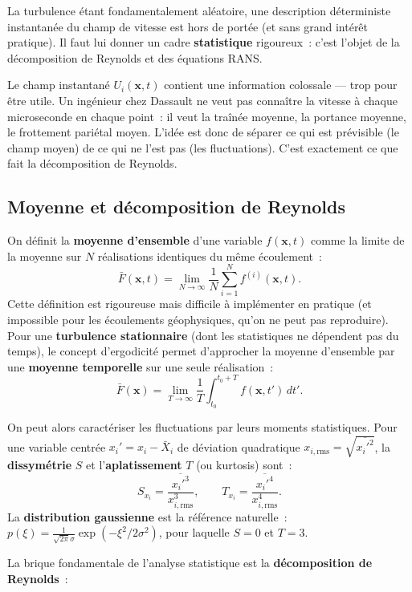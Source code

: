 \documentclass[11pt,a4paper]{report}
\begin{document}
La turbulence \'etant fondamentalement al\'eatoire, une description d\'eterministe
instantan\'ee du champ de vitesse est hors de port\'ee (et sans grand int\'er\^et
pratique). Il faut lui donner un cadre \textbf{statistique} rigoureux~: c'est l'objet
de la d\'ecomposition de Reynolds et des \'equations RANS.

Le champ instantan\'e $U_i(\bm{x},t)$ contient une information colossale --- trop pour
\^etre utile. Un ing\'enieur chez Dassault ne veut pas conna\^itre la vitesse \`a chaque
microseconde en chaque point~: il veut la tra\^in\'ee moyenne, la portance moyenne, le
frottement pari\'etal moyen. L'id\'ee est donc de s\'eparer ce qui est pr\'evisible (le champ
moyen) de ce qui ne l'est pas (les fluctuations). C'est exactement ce que fait la
d\'ecomposition de Reynolds.

\subsection{Moyenne et d\'ecomposition de Reynolds}

On d\'efinit la \textbf{moyenne d'ensemble} d'une variable $f(\bm{x},t)$
comme la limite de la moyenne sur $N$ r\'ealisations identiques du m\^eme \'ecoulement~:
\[
  \bar{F}(\bm{x},t) = \lim_{N\to\infty} \frac{1}{N}\sum_{i=1}^{N} f^{(i)}(\bm{x},t).
\]
Cette d\'efinition est rigoureuse mais difficile \`a impl\'ementer en pratique (et impossible pour
les \'ecoulements g\'eophysiques, qu'on ne peut pas reproduire). Pour une
\textbf{turbulence stationnaire} (dont les statistiques ne d\'ependent pas du temps), le
concept d'ergodicit\'e permet d'approcher la moyenne d'ensemble par une
\textbf{moyenne temporelle} sur une seule r\'ealisation~:
\[
  \bar{F}(\bm{x}) = \lim_{T\to\infty} \frac{1}{T}\int_{t_0}^{t_0+T}
  f(\bm{x},t')\,dt'.
\]

On peut alors caract\'eriser les fluctuations par leurs moments statistiques. Pour une variable
centr\'ee $x_i' = x_i - \bar{X}_i$ de d\'eviation quadratique
$x_{i,\mathrm{rms}} = \sqrt{\overline{x_i'^2}}$, la \textbf{dissym\'etrie} $S$ et
l'\textbf{aplatissement} $T$ (ou kurtosis) sont~:
\[
  S_{x_i} = \frac{\overline{x_i'^3}}{x_{i,\mathrm{rms}}^3},
  \qquad T_{x_i} = \frac{\overline{x_i'^4}}{x_{i,\mathrm{rms}}^4}.
\]
La \textbf{distribution gaussienne} est la r\'ef\'erence naturelle~:
$p(\xi) = \frac{1}{\sqrt{2\pi}\sigma}\exp(-\xi^2/2\sigma^2)$, pour laquelle $S=0$ et $T=3$.

\medskip
La brique fondamentale de l'analyse statistique est la \textbf{d\'ecomposition de Reynolds}~:
\end{document}
